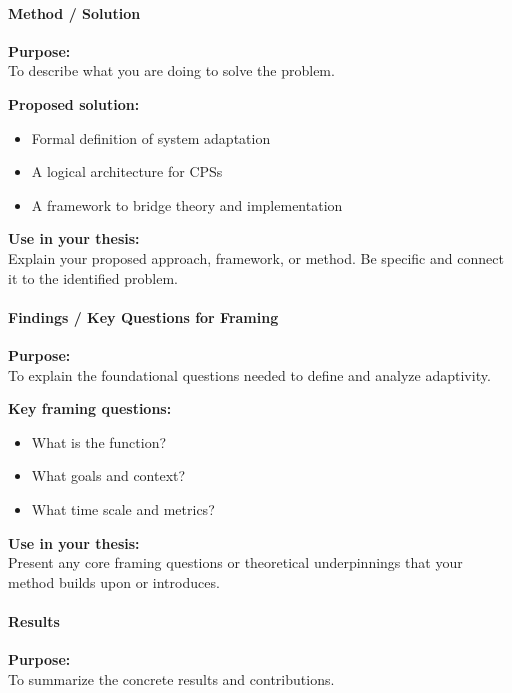 \paragraph{Method / Solution}
\textbf{Purpose:} \\
To describe what you are doing to solve the problem.

\vspace{0.5em}
\textbf{Proposed solution:}
\begin{itemize}
    \item Formal definition of system adaptation
    \item A logical architecture for CPSs
    \item A framework to bridge theory and implementation
\end{itemize}

\vspace{0.5em}
\textbf{Use in your thesis:} \\
Explain your proposed approach, framework, or method. Be specific and connect it to the identified problem.

\paragraph{Findings / Key Questions for Framing}
\textbf{Purpose:} \\
To explain the foundational questions needed to define and analyze adaptivity.

\vspace{0.5em}
\textbf{Key framing questions:}
\begin{itemize}
    \item What is the function?
    \item What goals and context?
    \item What time scale and metrics?
\end{itemize}

\vspace{0.5em}
\textbf{Use in your thesis:} \\
Present any core framing questions or theoretical underpinnings that your method builds upon or introduces.

\paragraph{Results}
\textbf{Purpose:} \\
To summarize the concrete results and contributions.

